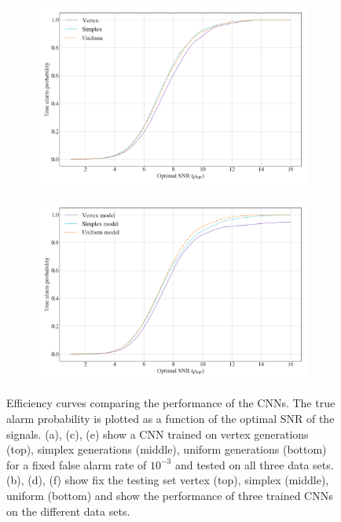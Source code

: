 \documentclass[12pt]{iopart}
\begin{document}
\begin{figure}[t!]
\medskip
\begin{subfigure}{0.48\textwidth}
\includegraphics[width=\linewidth]{figures/uniform_trained.png}
\caption{}\label{fig:e}
\end{subfigure}\hspace*{\fill}
\begin{subfigure}{0.48\textwidth}
\includegraphics[width=\linewidth]{figures/efficiency_curve_utest.png}
\caption{}\label{fig:f}
\end{subfigure}

\caption{Efficiency curves comparing the performance of the \acp{CNN}. The true alarm probability is plotted as a function of the optimal SNR of the signals. (a), (c), (e) show a CNN trained on
vertex generations (top), simplex generations (middle), uniform
generations (bottom) for a fixed false alarm rate of $10^{-3}$ and tested on all three data sets. (b), (d), (f) show fix the testing set vertex (top), simplex (middle), uniform (bottom) and show the performance of three trained CNNs on the different data sets.}   \label{fig:1}
\end{figure}
\end{document}
